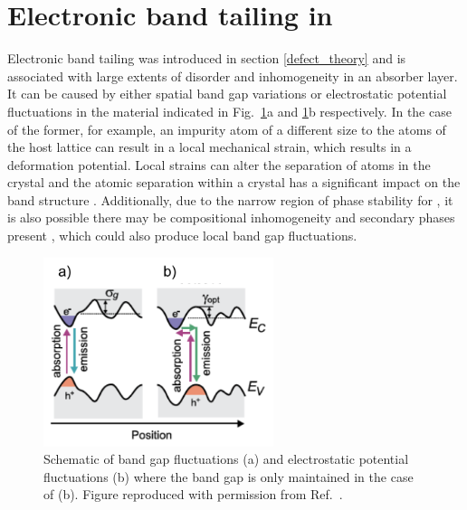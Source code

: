 \documentclass[11pt, twoside]{report}
\begin{document}





\section{Electronic band tailing in {\CZTS}}\label{eris_band_tailing}
Electronic band tailing was introduced in section \ref{defect_theory} and is associated with large extents of disorder and inhomogeneity in an absorber layer. It can be caused by either spatial band gap variations or electrostatic potential fluctuations in the material \cite{band_tail} indicated in Fig.~\ref{gokmen_band_tailing}a and \ref{gokmen_band_tailing}b respectively. In the case of the former, for example, an impurity atom of a different size to the atoms of the host lattice can result in a local mechanical strain, which results in a deformation potential. Local strains can alter the separation of atoms in the crystal and the atomic separation within a crystal has a significant impact on the band structure \cite{Pankove}. Additionally, due to the narrow region of phase stability for {\CZTS}, it is also possible there may be compositional inhomogeneity and secondary phases present \cite{SandS}, which could also produce local band gap fluctuations.

\begin{figure}[h!]
\centering
\includegraphics[width=0.6\textwidth]{figures/gokmen_band_tailing.png}
\caption[Schematic of band gap fluctuations (a) and electrostatic potential fluctuations (b) where the band gap is only maintained in the case of (b).]{Schematic of band gap fluctuations (a) and electrostatic potential fluctuations (b) where the band gap is only maintained in the case of (b). Figure reproduced with permission from Ref.~.}\label{gokmen_band_tailing}
\end{figure}
\end{document}
